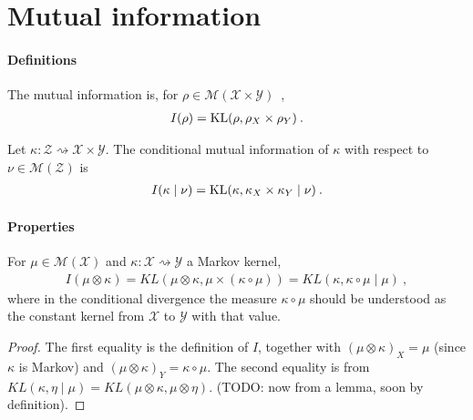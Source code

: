 
\section{Mutual information}

\paragraph{Definitions}

\begin{definition}
  \label{def:mutualInfo}
  The mutual information is, for $\rho \in \mathcal M(\mathcal X \times \mathcal Y)$~,
  \begin{align*}
  I(\rho) = \operatorname{KL}(\rho, \rho_X \times \rho_Y) \: .
  \end{align*}
\end{definition}


\begin{definition}
  \label{def:condMutualInfo}
  Let $\kappa : \mathcal Z \rightsquigarrow \mathcal X \times \mathcal Y$. The conditional mutual information of $\kappa$ with respect to $\nu \in \mathcal M(\mathcal Z)$ is
  \begin{align*}
  I(\kappa \mid \nu) = \operatorname{KL}(\kappa, \kappa_X \times \kappa_Y \mid \nu) \: .
  \end{align*}
\end{definition}


\paragraph{Properties}

\begin{lemma}
  \label{lem:mutualInfo_eq_condKL}
  For $\mu \in \mathcal M(\mathcal X)$ and $\kappa : \mathcal X \rightsquigarrow \mathcal Y$ a Markov kernel,
  \begin{align*}
  I(\mu \otimes \kappa)
  = KL(\mu \otimes \kappa, \mu \times (\kappa \circ \mu))
  = KL(\kappa, \kappa \circ \mu \mid \mu)
  \: ,
  \end{align*}
  where in the conditional divergence the measure $\kappa \circ \mu$ should be understood as the constant kernel from $\mathcal X$ to $\mathcal Y$ with that value.
\end{lemma}

\begin{proof}%
\uses{}
The first equality is the definition of $I$, together with $(\mu \otimes \kappa)_X = \mu$ (since $\kappa$ is Markov) and $(\mu \otimes \kappa)_Y = \kappa \circ \mu$.
The second equality is from $KL(\kappa, \eta \mid \mu) = KL(\mu \otimes \kappa, \mu \otimes \eta)$. (TODO: now from a lemma, soon by definition).
\end{proof}


